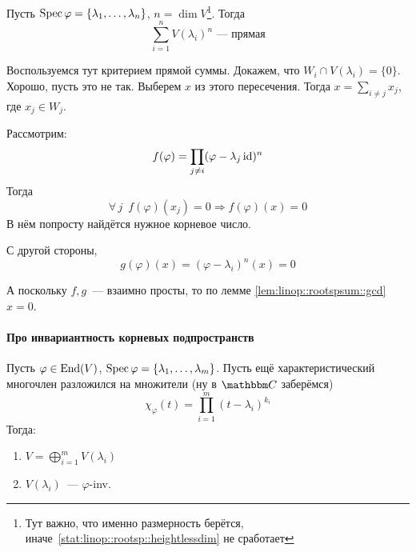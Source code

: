 \documentclass[12pt]{../../../notes}
\begin{document}
\begin{thrm}\label{thrm:linop::rootspsum}
  Пусть $\operatorname{Spec} \varphi = \{\lambda_1, \dotsc , \lambda_n\}$, $n = \dim V$\footnote{Тут важно,
    что именно размерность берётся, иначе~\ref{stat:linop::rootsp::heightlessdim} не сработает}.
  Тогда 
  \[
    \sum_{i=1}^{n} V(\lambda_i)^n\text{~--- прямая}
  \]
\end{thrm}
\begin{ittproof}
  Воспользуемся тут критерием прямой суммы. Докажем, что $W_i \cap V(\lambda_i) = \{0\}$.
  Хорошо, пусть это не так. Выберем $x$ из этого пересечения. Тогда $x= \sum_{i\neq j} x_j$,
  где $x_j \in W_j$.

  Рассмотрим:
  \begin{align*}
    f(\varphi) = \prod_{j\neq i} (\varphi -\lambda_j \operatorname{id})^n
  \end{align*}
  Тогда 
  \[
    \forall\, j \;\: f(\varphi)(x_j) = 0 \Rightarrow f(\varphi)(x) = 0
  \]
  В нём попросту найдётся нужное корневое число. 
  
  С другой стороны, \[
    g(\varphi)(x) = (\varphi - \lambda_i)^n(x) = 0
  \]

  А поскольку $f, g$~--- взаимно просты, то по лемме \ref{lem:linop::rootspsum::gcd} $x=0$.
\end{ittproof}
\newpage
{}
\newpage
\paragraph{Про инвариантность корневых подпространств}
\begin{thrm}\label{thrm:linop::rootspinv}
  Пусть $\varphi \in \operatorname{End} (V)$, $\operatorname{Spec} \varphi = \{\lambda_1, \dotsc , \lambda_m\}$.
  Пусть ещё характеристический многочлен разложился на множители (ну в $\C$ заберёмся)
  \[
    \chi_\varphi(t) = \prod_{i=1}^m (t-\lambda_i)^{k_i}
  \]
  Тогда:
  \begin{enumerate}
    \item $\displaystyle V = \bigoplus\limits_{i=1}^m V(\lambda_i)$
    \item $\displaystyle V(\lambda_i)$~--- $\varphi$-inv.
  \end{enumerate}
\end{thrm}
\end{document}
